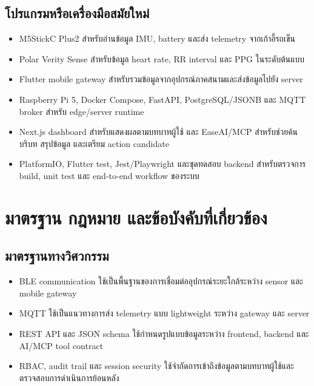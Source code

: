 \subsection*{โปรแกรมหรือเครื่องมือสมัยใหม่}
\begin{itemize}
    \item M5StickC Plus2 สำหรับอ่านข้อมูล IMU, battery และส่ง telemetry จากเก้าอี้รถเข็น 
    \item Polar Verity Sense สำหรับข้อมูล heart rate, RR interval และ PPG ในระดับต้นแบบ 
    \item Flutter mobile gateway สำหรับรวมข้อมูลจากอุปกรณ์ภาคสนามและส่งข้อมูลไปยัง server 
    \item Raspberry Pi 5, Docker Compose, FastAPI, PostgreSQL/JSONB และ MQTT broker สำหรับ edge/server runtime 
    \item Next.js dashboard สำหรับแสดงผลตามบทบาทผู้ใช้ และ EaseAI/MCP สำหรับช่วยค้นบริบท สรุปข้อมูล และเตรียม action candidate 
    \item PlatformIO, Flutter test, Jest/Playwright และชุดทดสอบ backend สำหรับตรวจการ build, unit test และ end-to-end workflow ของระบบ 
\end{itemize}

\section{มาตรฐาน กฎหมาย และข้อบังคับที่เกี่ยวข้อง}

\subsection*{มาตรฐานทางวิศวกรรม}
\begin{itemize}
    \item BLE communication ใช้เป็นพื้นฐานของการเชื่อมต่ออุปกรณ์ระยะใกล้ระหว่าง sensor และ mobile gateway 
    \item MQTT ใช้เป็นแนวทางการส่ง telemetry แบบ lightweight ระหว่าง gateway และ server 
    \item REST API และ JSON schema ใช้กำหนดรูปแบบข้อมูลระหว่าง frontend, backend และ AI/MCP tool contract 
    \item RBAC, audit trail และ session security ใช้จำกัดการเข้าถึงข้อมูลตามบทบาทผู้ใช้และตรวจสอบการดำเนินการย้อนหลัง 
\end{itemize}


